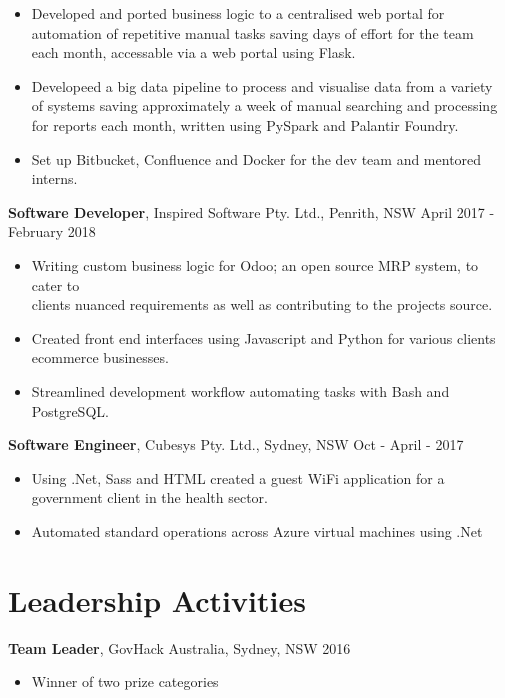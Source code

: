 \documentclass[margin]{res}
\begin{document}
\begin{resume}
\begin{itemize}
\item Developed and ported business logic to a centralised web portal for \\
	automation of repetitive manual tasks saving days of effort for the team \\ 
		each month, accessable via a web portal using Flask. 

\item Developeed a big data pipeline to process and visualise data from a variety \\
	of systems saving approximately a week of manual searching and processing \\
		for reports each month, written using PySpark and Palantir Foundry.

\item Set up Bitbucket, Confluence and Docker for the dev team and mentored interns. 

\end{itemize}

{\bf Software Developer}, 
	Inspired Software Pty. Ltd., Penrith, NSW \hfill April 2017 - February 2018
\begin{itemize} \itemsep 2pt  %
\item Writing custom business logic for Odoo; an open source MRP system, to cater to \\
	clients nuanced requirements as well as contributing to the projects source.

\item  Created front end interfaces using Javascript and Python for various clients \\
	ecommerce businesses.

\item Streamlined development workflow automating tasks with Bash and PostgreSQL.
\end{itemize}

 {\bf Software Engineer}, 
	Cubesys Pty. Ltd., Sydney, NSW \hfill Oct - April - 2017
 \begin{itemize} \itemsep 2pt  %
 \item Using .Net, Sass and HTML created a guest WiFi application for a \\
	 government client in the health sector.
 \item Automated standard operations across Azure virtual machines using .Net
 \end{itemize}

\section{Leadership   Activities}
               {\bf Team Leader}, GovHack Australia, Sydney, NSW    \hfill        2016
                \begin{itemize} \itemsep -2pt
              	\item Winner of two prize categories 
		\end{itemize}


\end{resume}
\end{document}
